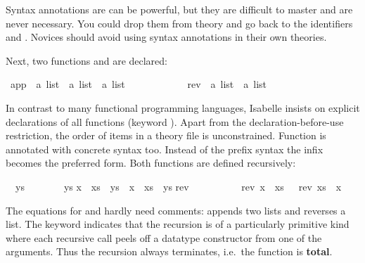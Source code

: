 \begin{isabellebody}
\begin{isamarkuptext}
\begin{warn}
  Syntax annotations are can be powerful, but they are difficult to master and 
  are never necessary.  You
  could drop them from theory  and go back to the identifiers
   and .
  Novices should avoid using
  syntax annotations in their own theories.
\end{warn}
Next, two functions  and  are declared:%
\end{isamarkuptext}%
\isamarkuptrue%
\ app\ {\isacharcolon}{\isacharcolon}\ {\isachardoublequote}{\isacharprime}a\ list\ {\isasymRightarrow}\ {\isacharprime}a\ list\ {\isasymRightarrow}\ {\isacharprime}a\ list{\isachardoublequote}\ \ \ {\isacharparenleft}\ {\isachardoublequote}{\isacharat}{\isachardoublequote}\ {}{}{\isacharparenright}\isanewline
\ \ \ \ \ \ \ rev\ {\isacharcolon}{\isacharcolon}\ {\isachardoublequote}{\isacharprime}a\ list\ {\isasymRightarrow}\ {\isacharprime}a\ list{\isachardoublequote}\isamarkupfalse%
%
\begin{isamarkuptext}%
\noindent
In contrast to many functional programming languages,
Isabelle insists on explicit declarations of all functions
(keyword ).  Apart from the declaration-before-use
restriction, the order of items in a theory file is unconstrained. Function
 is annotated with concrete syntax too. Instead of the
prefix syntax  the infix
 becomes the preferred
form. Both functions are defined recursively:%
\end{isamarkuptext}%
\isamarkuptrue%
\isanewline
{\isachardoublequote}{\isacharbrackleft}{\isacharbrackright}\ {\isacharat}\ ys\ \ \ \ \ \ \ {\isacharequal}\ ys{\isachardoublequote}\isanewline
{\isachardoublequote}{\isacharparenleft}x\ {\isacharhash}\ xs{\isacharparenright}\ {\isacharat}\ ys\ {\isacharequal}\ x\ {\isacharhash}\ {\isacharparenleft}xs\ {\isacharat}\ ys{\isacharparenright}{\isachardoublequote}\isanewline
\isanewline
\isamarkupfalse%
\isanewline
{\isachardoublequote}rev\ {\isacharbrackleft}{\isacharbrackright}\ \ \ \ \ \ \ \ {\isacharequal}\ {\isacharbrackleft}{\isacharbrackright}{\isachardoublequote}\isanewline
{\isachardoublequote}rev\ {\isacharparenleft}x\ {\isacharhash}\ xs{\isacharparenright}\ \ {\isacharequal}\ {\isacharparenleft}rev\ xs{\isacharparenright}\ {\isacharat}\ {\isacharparenleft}x\ {\isacharhash}\ {\isacharbrackleft}{\isacharbrackright}{\isacharparenright}{\isachardoublequote}\isamarkupfalse%
%
\begin{isamarkuptext}%
\noindent{}
The equations for  and  hardly need comments:
 appends two lists and  reverses a list.  The
keyword  indicates that the recursion is
of a particularly primitive kind where each recursive call peels off a datatype
constructor from one of the arguments.  Thus the
recursion always terminates, i.e.\ the function is \textbf{total}.


\end{isamarkuptext}
\end{isabellebody}
